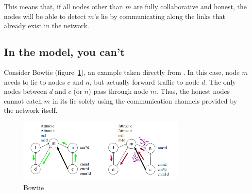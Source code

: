 \documentclass[12pt]{article}
\begin{document}



  This means that, if all nodes other than $m$ are fully collaborative and
  honest, the nodes will be able to detect $m$'s lie
  by communicating along the links that already exist in the network.

  \subsection{In the \cite{Attraction} model, you can't}
    Consider Bowtie (figure~\ref{fig:Bowtie}),
    an example taken directly from \cite{Attraction}.
    In this case, node $m$ needs to lie to nodes $c$ and $n$,
    but actually forward traffic to node $d$.
    The only nodes between $d$ and $c$ (or $n$) pass through node $m$.
    Thus, the honest nodes cannot catch $m$ in its lie solely using 
    the communication channels provided by the network itself.

    \begin{figure}[h]
      \centering
      \caption{Bowtie}\label{fig:Bowtie}
      \includegraphics[width=0.75\textwidth]{Bowtie}
    \end{figure}
\end{document}
